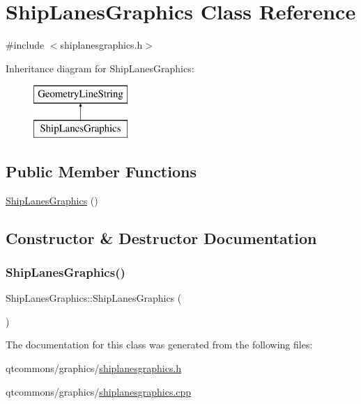 \hypertarget{class_ship_lanes_graphics}{}\section{Ship\+Lanes\+Graphics Class Reference}
\label{class_ship_lanes_graphics}


{\ttfamily \#include $<$shiplanesgraphics.\+h$>$}

Inheritance diagram for Ship\+Lanes\+Graphics\+:\begin{figure}[H]
\begin{center}
\leavevmode
\includegraphics[height=2.000000cm]{d9/d42/class_ship_lanes_graphics}
\end{center}
\end{figure}
\subsection*{Public Member Functions}
\begin{DoxyCompactItemize}
\item 
\mbox{\hyperlink{class_ship_lanes_graphics_ae6d3207c1772c43e12e4a1e97b71ec3a}{Ship\+Lanes\+Graphics}} ()
\end{DoxyCompactItemize}


\subsection{Constructor \& Destructor Documentation}
\mbox{\label{class_ship_lanes_graphics_ae6d3207c1772c43e12e4a1e97b71ec3a}} 
\subsubsection{\texorpdfstring{ShipLanesGraphics()}{ShipLanesGraphics()}}
{\footnotesize\ttfamily Ship\+Lanes\+Graphics\+::\+Ship\+Lanes\+Graphics (\begin{DoxyParamCaption}{ }\end{DoxyParamCaption})}



The documentation for this class was generated from the following files\+:\begin{DoxyCompactItemize}
\item 
qtcommons/graphics/\mbox{\hyperlink{shiplanesgraphics_8h}{shiplanesgraphics.\+h}}\item 
qtcommons/graphics/\mbox{\hyperlink{shiplanesgraphics_8cpp}{shiplanesgraphics.\+cpp}}\end{DoxyCompactItemize}
